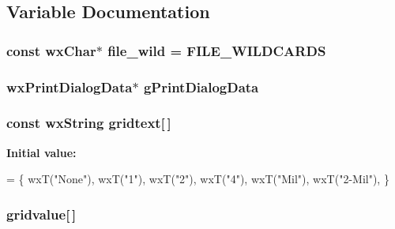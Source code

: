 \subsection{Variable Documentation}
\hypertarget{a00230_a4841d82d107bf3e5331296d3527b192d}{
\subsubsection[{file\-\_\-wild}]{\setlength{\rightskip}{0pt plus 5cm}const wx\-Char$\ast$ file\-\_\-wild = {\bf F\-I\-L\-E\-\_\-\-W\-I\-L\-D\-C\-A\-R\-D\-S}\hspace{0.3cm}{\ttfamily [static]}}}\label{a00230_a4841d82d107bf3e5331296d3527b192d}
\hypertarget{a00230_a896ed5b078417657f1ceef1e87abe705}{
\subsubsection[{g\-Print\-Dialog\-Data}]{\setlength{\rightskip}{0pt plus 5cm}wx\-Print\-Dialog\-Data$\ast$ g\-Print\-Dialog\-Data}}\label{a00230_a896ed5b078417657f1ceef1e87abe705}
\hypertarget{a00230_a78f09467cace2629c2a2374a7f4bdc07}{
\subsubsection[{gridtext}]{\setlength{\rightskip}{0pt plus 5cm}const wx\-String gridtext\mbox{[}$\,$\mbox{]}}}\label{a00230_a78f09467cace2629c2a2374a7f4bdc07}
{\bfseries Initial value\-:}
\begin{DoxyCode}
=
\{
    wxT(\textcolor{stringliteral}{"None"}),
    wxT(\textcolor{stringliteral}{"1"}),
    wxT(\textcolor{stringliteral}{"2"}),
    wxT(\textcolor{stringliteral}{"4"}),
    wxT(\textcolor{stringliteral}{"Mil"}),
    wxT(\textcolor{stringliteral}{"2-Mil"}),
\}
\end{DoxyCode}
\hypertarget{a00230_a75782416c96d40b05fd547805f028dbd}{
\subsubsection[{gridvalue}]{ gridvalue\mbox{[}$\,$\mbox{]}}}\label{a00230_a75782416c96d40b05fd547805f028dbd}
